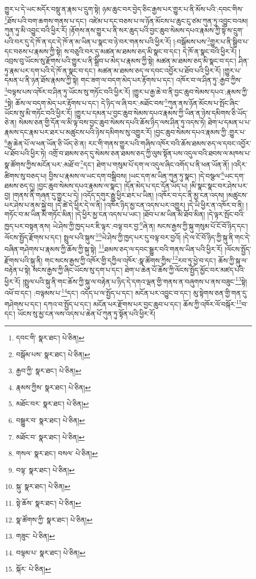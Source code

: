 གྱུར་པ་དེ་ཡང་མདོར་བསྡུ་ན་རྣམ་པ་དྲུག་སྟེ། ཉམ་ཆུང་བར་བྱེད་ཅིང་རྒྱས་པར་གྱུར་པ་ནི་མོས་པའི་:དབང་གིས་\footnote{དབང་གི་  སྣར་ཐང་།  པེ་ཅིན། }ཐོས་པའི་བག་ཆགས་གནས་པ་དང་། འཛེམ་པ་དང་བཅས་པ་ལ་ཉོན་མོངས་པ་ཆུང་ངུ་ཙམ་ཀུན་ཏུ་འབྱུང་བའམ། ཀུན་ཏུ་མི་འབྱུང་བའི་ཕྱིར་རོ། །རྟོགས་ནས་གྱུར་པ་ནི་སར་ཆུད་པའི་བྱང་ཆུབ་སེམས་དཔའ་རྣམས་ཀྱི་སྟེ་ས་དྲུག་པའི་བར་དུ་དེ་ཁོ་ན་དང་དེ་ཁོ་ན་མ་ཡིན་པ་སྣང་བ་ཉེ་བར་གནས་པའི་ཕྱིར་རོ། །:བསྒོམས་པས་\footnote{བསྒོམ་པས་  སྣར་ཐང་།  པེ་ཅིན། }གྱུར་པ་ནི་སྒྲིབ་པ་དང་བཅས་པ་རྣམས་ཀྱི་སྟེ། ས་བཅུའི་བར་དུ་མཚན་མ་ཐམས་ཅད་མི་སྣང་བ་དང་། དེ་ཁོ་ན་སྣང་བའི་ཕྱིར་རོ། །འབྲས་བུ་ཡོངས་སུ་རྫོགས་པའི་གྱུར་པ་ནི་སྒྲིབ་པ་མེད་པ་རྣམས་ཀྱི་སྟེ། མཚན་མ་ཐམས་ཅད་མི་སྣང་བ་དང་། ཤིན་ཏུ་རྣམ་པར་དག་པའི་དེ་ཁོ་ན་སྣང་བ་དང་། མཚན་མ་ཐམས་ཅད་ལ་དབང་འབྱོར་པ་ཐོབ་པའི་ཕྱིར་རོ། །གྱུར་པ་དམན་པ་ནི་ཉན་ཐོས་རྣམས་ཀྱི་སྟེ། གང་ཟག་ལ་བདག་མེད་པར་རྟོགས་པ་དང་། འཁོར་བ་ལ་ཤིན་ཏུ་:རྒྱབ་ཀྱིས་\footnote{རྒྱབ་ཀྱི་  སྣར་ཐང་།  པེ་ཅིན། }བལྟས་པས་འཁོར་བ་ཤིན་ཏུ་ཡོངས་སུ་གཏོང་བའི་ཕྱིར་རོ། །གྱུར་པ་རྒྱ་ཆེ་བ་ནི་བྱང་ཆུབ་སེམས་དཔའ་:རྣམས་ཀྱི་\footnote{རྣམས་ཀྱིས་  སྣར་ཐང་།  པེ་ཅིན། }སྟེ། ཆོས་ལ་བདག་མེད་པར་རྟོགས་པ་དང་། དེ་ཉིད་ལ་ཞི་བར་:མཐོང་བས་\footnote{མཐོང་བར་  སྣར་ཐང་།  པེ་ཅིན། }ཀུན་ནས་ཉོན་མོངས་པ་སྤོང་ཞིང་ཡོངས་སུ་མི་གཏོང་བའི་ཕྱིར་རོ། །གྱུར་པ་དམན་པ་བྱང་ཆུབ་སེམས་དཔའ་རྣམས་ཀྱི་ཡིན་ན་ཉེས་དམིགས་ཅི་ཡོད་ཅེ་ན། སེམས་ཅན་གྱི་དོན་ལ་མི་ལྟ་བས་བྱང་ཆུབ་སེམས་དཔའི་ཆོས་ཉིད་ལས་ཤིན་ཏུ་འདས་ཏེ། ཐེག་པ་དམན་པ་པ་རྣམས་དང་རྣམ་པར་ཐར་པ་མཚུངས་པའི་ཉེས་དམིགས་སུ་འགྱུར་རོ། །བྱང་ཆུབ་སེམས་དཔའ་རྣམས་ཀྱི་:གྱུར་པ་\footnote{བསྒྱུར་བ་  སྣར་ཐང་།  པེ་ཅིན། }རྒྱ་ཆེན་པོ་ལ་ཕན་ཡོན་ཅི་ཡོད་ཅེ་ན། རང་གི་གནས་གྱུར་པའི་གཞིས་འཁོར་བའི་ཆོས་ཐམས་ཅད་ལ་དབང་འབྱོར་པ་ཐོབ་པའི་ཕྱིར་ཏེ། འགྲོ་བ་ཐམས་ཅད་དུ་སེམས་ཅན་ཐམས་ཅད་ཀྱི་ལུས་སྟོན་པས་འདུལ་བའི་ཐབས་ལ་མཁས་པ་སྣ་ཚོགས་ཀྱིས་མངོན་པར་:མཐོ་བ་\footnote{མཐོང་བ་  སྣར་ཐང་།  པེ་ཅིན། }དང་། ཐེག་པ་གསུམ་པོ་དག་ལ་འདུལ་ཞིང་འགོད་པ་ནི་ཕན་ཡོན་ནོ། །འདིར་ཚིགས་སུ་བཅད་པ། བྱིས་པ་རྣམས་ལ་ཡང་དག་བསྒྲིབས། །ཡང་དག་མ་ཡིན་ཀུན་ཏུ་སྣང་། །དེ་བསྩལ་\footnote{གསལ་  སྣར་ཐང་། བསལ་  པེ་ཅིན། }ཡང་དག་ཐམས་ཅད་དུ། །བྱང་ཆུབ་སེམས་དཔའ་རྣམས་ལ་སྣང་། །དོན་མེད་པ་དང་དོན་ཡོད་པ། །མི་སྣང་སྣང་བར་ཤེས་པར་བྱ། །གནས་ནི་གཞན་དུ་གྱུར་པ་དེ། །འདོད་དགུར་རྒྱུ་ཕྱིར་ཐར་པ་ཡིན། །འཁོར་བ་དང་ནི་མྱ་ངན་འདས། །མཚུངས་པར་ཤེས་པ་ནམ་སྐྱེ་བ། །དེ་ཚེ་དེ་ཕྱིར་དེ་ལ་ནི། །འཁོར་ཉིད་མྱ་ངན་འདས་པར་འགྱུར། །དེ་ཡི་ཕྱིར་ན་འཁོར་བ་ནི། །གཏོང་བ་མ་ཡིན་མི་གཏོང་མིན། །དེ་ཕྱིར་མྱ་ངན་འདས་པ་ཡང་། །ཐོབ་པ་མ་ཡིན་མི་ཐོབ་མིན། །དེ་ལྟར་སྤོང་བའི་ཁྱད་པར་བསྟན་ནས། ཡེ་ཤེས་ཀྱི་ཁྱད་པར་ཇི་ལྟར་:བལྟ་བར་བྱ་\footnote{བལྟ་  སྣར་ཐང་།  པེ་ཅིན། }ཞེ་ན། སངས་རྒྱས་ཀྱི་སྐུ་གསུམ་པོ་ངོ་བོ་ཉིད་དང་། ལོངས་སྤྱོད་རྫོགས་པ་དང་། སྤྲུལ་པའི་སྐུས་\footnote{སྐུ་  སྣར་ཐང་།  པེ་ཅིན། }ཡེ་ཤེས་ཀྱི་ཁྱད་པར་དུ་བལྟ་བར་བྱའོ། །དེ་ལ་ངོ་བོ་ཉིད་ཀྱི་སྐུ་ནི་གང་དེ་བཞིན་གཤེགས་པ་རྣམས་ཀྱི་ཆོས་ཀྱི་སྐུ་སྟེ། \footnote{སྟེ་ཆོས་  སྣར་ཐང་།  པེ་ཅིན། }ཐམས་ཅད་ལ་དབང་སྒྱུར་བའི་གནས་ཡིན་པའི་ཕྱིར་རོ། །ལོངས་སྤྱོད་རྫོགས་པའི་སྐུ་ནི། གང་སངས་རྒྱས་ཀྱི་འཁོར་གྱི་དཀྱིལ་འཁོར་:སྣ་ཚོགས་ཀྱིས་\footnote{སྣ་ཚོགས་ཀྱི་  སྣར་ཐང་།  པེ་ཅིན། }རབ་ཏུ་ཕྱེ་བ་དང་། ཆོས་ཀྱི་སྐུ་ལ་བརྟེན་པ་སྟེ། སངས་རྒྱས་ཀྱི་ཞིང་ཡོངས་སུ་དག་པ་དང་། ཐེག་པ་ཆེན་པོ་ཆོས་ཀྱི་ལོངས་སྤྱོད་མྱོང་བར་མཛད་པའི་ཕྱིར་རོ། །སྤྲུལ་པའི་སྐུ་ནི་གང་ཆོས་ཀྱི་སྐུ་ལ་བརྟེན་པ་ཉིད་དེ་དགའ་ལྡན་གྱི་གནས་ན་བཞུགས་པ་ནས་བཟུང་\footnote{གཟུང་  པེ་ཅིན། }སྟེ། འཕོ་བ་དང་། :བལྟམས་པ་\footnote{བལྟམ་པ་  སྣར་ཐང་།  པེ་ཅིན། }དང་། འདོད་པ་ལ་སྤྱོད་པ་དང་། མངོན་པར་འབྱུང་བ་དང་། མུ་སྟེགས་ཅན་གྱི་གན་དུ་གཤེགས་པ་དང་། དཀའ་བ་སྤྱོད་པ་དང་། མངོན་པར་རྫོགས་པར་བྱང་ཆུབ་པ་དང་། ཆོས་ཀྱི་འཁོར་ལོ་བསྐོར་\footnote{སྐོར་  པེ་ཅིན། }བ་དང་། ཡོངས་སུ་མྱ་ངན་ལས་འདས་པ་ཆེན་པོ་ཀུན་ཏུ་སྟོན་པའི་ཕྱིར་རོ། 